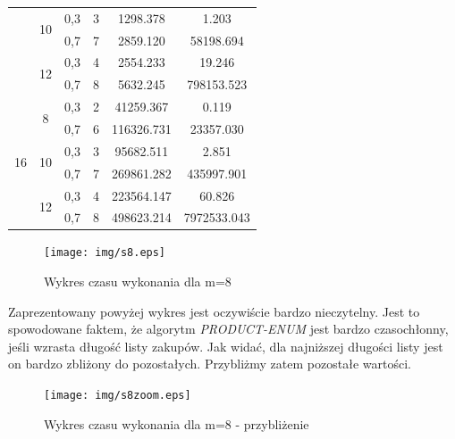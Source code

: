 \documentclass[a4paper]{article}
\begin{document}
\begin{table}[H]
\begin{tabular}{|c|c|c|c|c|c|}
                    & \multirow{2}{*}{10} & 0,3 & 3           & 1298.378           & 1.203                 \\ \cline{3-6} 
                    &                     & 0,7 & 7           & 2859.120           & 58198.694             \\ \cline{2-6} 
                    & \multirow{2}{*}{12} & 0,3 & 4           & 2554.233           & 19.246                \\ \cline{3-6} 
                    &                     & 0,7 & 8           & 5632.245           & 798153.523            \\ \hline
\multirow{6}{*}{16} & \multirow{2}{*}{8}  & 0,3 & 2           & 41259.367          & 0.119                 \\ \cline{3-6} 
                    &                     & 0,7 & 6           & 116326.731         & 23357.030             \\ \cline{2-6} 
                    & \multirow{2}{*}{10} & 0,3 & 3           & 95682.511          & 2.851                 \\ \cline{3-6} 
                    &                     & 0,7 & 7           & 269861.282         & 435997.901            \\ \cline{2-6} 
                    & \multirow{2}{*}{12} & 0,3 & 4           & 223564.147         & 60.826                \\ \cline{3-6} 
                    &                     & 0,7 & 8           & 498623.214         & 7972533.043           \\ \hline
\end{tabular}
\end{table}

\begin{figure}[H]
\centering
\texttt{[image: img/s8.eps]}
\caption{Wykres czasu wykonania dla m=8}
\end{figure}

Zaprezentowany powyżej wykres jest oczywiście bardzo nieczytelny. Jest to spowodowane faktem, że algorytm \textit{PRODUCT-ENUM} jest bardzo czasochłonny, jeśli wzrasta długość listy zakupów. Jak widać, dla najniższej długości listy jest on bardzo zbliżony do pozostałych. Przybliżmy zatem pozostałe wartości.

\begin{figure}[H]
\centering
\texttt{[image: img/s8zoom.eps]}
\caption{Wykres czasu wykonania dla m=8 - przybliżenie}
\end{figure}
\end{document}
